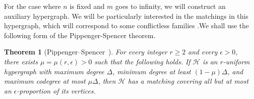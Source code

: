 \documentclass[12pt,UKenglish]{amsart}
\newtheorem{thm}{Theorem}[section]
\theoremstyle{plain}
\theoremstyle{definition}
\theoremstyle{remark}
\begin{document}
For the case where $n$ is fixed and $m$ goes to infinity, we will construct an auxiliary hypergraph. We will be particularly interested in the matchings in this hypergraph, which will correspond to some conflictless families .We shall use the following form of the Pippenger-Spencer theorem.
\begin{thm}[Pippenger--Spencer~\cite{PIPPENGER198924}]\label{thm:pippenger-spencer}
For every integer $r\ge2$ and every $\epsilon>0$, there exists $\mu=\mu(r,\epsilon)>0$ such that the following holds. If $\mathcal H$ is an $r$-uniform hypergraph with maximum degree $\Delta$, minimum degree at least $(1-\mu)\Delta$, and maximum codegree at most $\mu\Delta$, then $\mathcal H$ has a matching covering all but at most an $\epsilon$-proportion of its vertices.
\end{thm}
\end{document}
